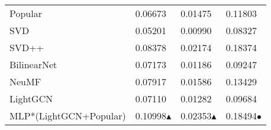 \begin{tabular}{llll}
 Popular               & 0.06673                                                & 0.01475                                                & 0.11803                                                \\
 SVD                   & 0.05201                                                & 0.00990                                                & 0.08327                                                \\
 SVD++                 & 0.08378                                                & 0.02174                                                & 0.18374                                                \\
 BilinearNet           & 0.07173                                                & 0.01186                                                & 0.09247                                                \\
 NeuMF                 & 0.07917                                                & 0.01586                                                & 0.13429                                                \\
 LightGCN              & 0.07110                                                & 0.01282                                                & 0.09684                                                \\
 MLP*(LightGCN+Popular) & 0.10998\textcolor[rgb]{00,0.45,0.10}{$\blacktriangle$} & 0.02353\textcolor[rgb]{00,0.45,0.10}{$\blacktriangle$} & 0.18494\textcolor[rgb]{0.7,0.7,0.0}{$\bullet$}         \\
\hline
\end{tabular}
